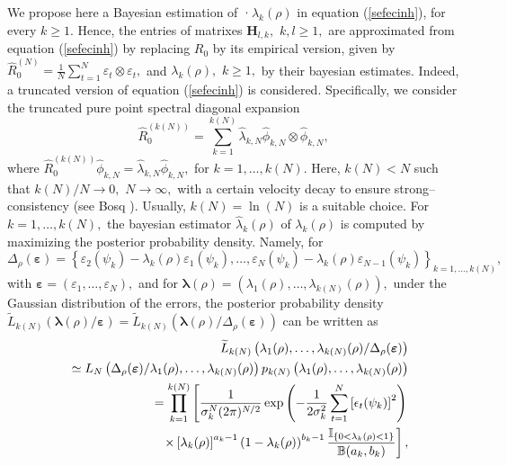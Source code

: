 \documentclass[11pt,a4paper]{article}
\begin{document}
We propose here a Bayesian estimation of ·$\lambda_{k}(\rho)$ in equation (\ref{sefecinh}), for every $k\geq 1.$ Hence, the entries of matrixes $\mathbf{H}_{l,k},$ $k,l\geq 1,$ are approximated from equation (\ref{sefecinh}) by replacing $R_{0}$ by its empirical version, given by  $\widehat{R}_{0}^{(N)}=\frac{1}{N}\sum_{t=1}^{N}\varepsilon_{t}\otimes \varepsilon_{t},$ and $\lambda_{k}(\rho),$ $k\geq 1,$ by their bayesian estimates.  Indeed, a truncated version of equation (\ref{sefecinh}) is considered.  Specifically,  we consider the truncated pure point  spectral  diagonal expansion
\begin{equation}\widehat{R}_{0}^{(k(N))}=\sum_{k=1}^{k(N)}\widehat{\lambda }_{k,N}\widehat{\phi}_{k,N}\otimes \widehat{\phi}_{k,N},\label{revco}
\end{equation}
\noindent where  $\widehat{R}_{0}^{(k(N))}\widehat{\phi}_{k,N}=\widehat{\lambda }_{k,N}\widehat{\phi}_{k,N},$  for $k=1,\dots,k(N).$
Here,  $k(N)<N$ such that $k(N)/N\to 0,$ $N\to \infty,$  with a certain velocity decay to ensure strong--consistency (see Bosq
 \cite{Bosq00}). Usually, $k(N)=\ln (N)$ is a suitable choice.  For $k=1,\dots , k(N),$ the bayesian estimator $\widehat{\lambda}_{k}(\rho)$   of $\lambda_{k}(\rho)$   is computed by maximizing  the posterior probability density. Namely, for $$\Delta_{\rho}(\boldsymbol{\varepsilon})= \left\{\varepsilon_{2}(\psi_{k})-\lambda_{k}(\rho )\varepsilon_{1}(\psi_{k}),\dots,
\varepsilon_{N}(\psi_{k})-\lambda_{k}(\rho )\varepsilon_{N-1}(\psi_{k})\right\}_{k=1,\dots,k(N)},$$ \noindent  with $\boldsymbol{\varepsilon}=(\varepsilon_{1},\dots,\varepsilon_{N}),$
 and  for  $\boldsymbol{\lambda}(\rho)=(\lambda_{1}(\rho ),\dots,\lambda_{k(N)}(\rho )),$  under the Gaussian distribution of the errors,
the posterior probability density   $\widetilde{L}_{k(N)}\left(\boldsymbol{\lambda}(\rho)/\boldsymbol{\varepsilon}\right)=\widetilde{L}_{k(N)}\left(\boldsymbol{\lambda}(\rho)/
\Delta_{\rho}(\boldsymbol{\varepsilon})\right)$  can be written
 as
\begin{eqnarray}&&
\widetilde{L}_{k(N)}\left(\lambda_{1}(\rho ),\dots,\lambda_{k(N)}(\rho )/\Delta_{\rho}(\boldsymbol{\varepsilon})\right)
\nonumber\\
&&\simeq L_{N}\left(\Delta_{\rho}(\boldsymbol{\varepsilon})/\lambda_{1}(\rho ),\dots,\lambda_{k(N)}(\rho )\right)
p_{k(N)}\left(\lambda_{1}(\rho ),\dots,\lambda_{k(N)}(\rho )\right)
\nonumber\\
&&=\prod_{k=1}^{k(N)}\left[\frac{1}{\sigma_{k}^{N}  (2\pi)^{N/2}} \exp \left( -\frac{1}{2\sigma^2_{k}}\sum_{t=1}^{N}\left[\epsilon_{t}(\psi_{k})\right]^2 \right)\right.\nonumber\\
& &\hspace*{1cm}\left.\times \left[\lambda_{k}(\rho )\right]^{a_{k}-1}\left(1-\lambda_{k}(\rho )\right)^{b_{k}-1} \frac{\mathbb{I}_{\{0<\lambda_{k}(\rho )<1\}}}{\mathbb{B}(a_{k}, b_{k})}\right],
\label{eqbayest}
\end{eqnarray}
\end{document}
